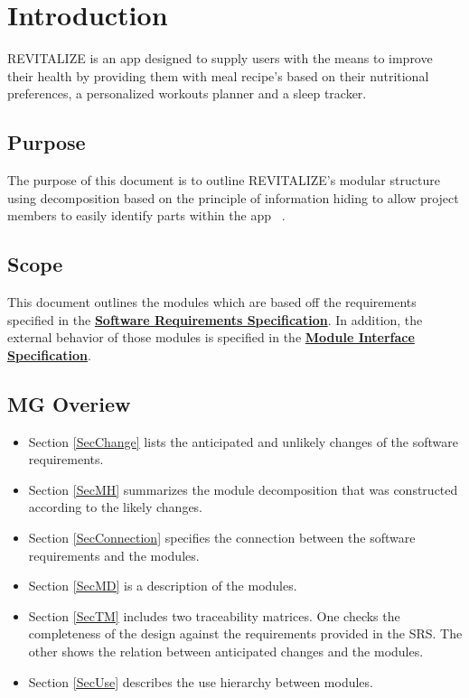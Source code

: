 \documentclass[12pt, titlepage]{article}
\begin{document}
\newpage

\tableofcontents

\listoftables

\listoffigures

\newpage


\section{Introduction}
REVITALIZE is an app designed to supply users with the means to improve their health by providing them with meal recipe's based on their nutritional preferences, a personalized workouts planner and a sleep tracker.  

\subsection{Purpose}
The purpose of this document is to outline REVITALIZE's modular structure using decomposition based on the principle of information hiding to allow project members to easily identify parts within the app ~\citep{Parnas1972a}.

\subsection{Scope}
This document outlines the modules which are based off the requirements specified
in the \href{https://github.com/BillNguyen1999/REVITALIZE/blob/main/docs/SRS/SRS.pdf}{\textbf{Software Requirements Specification}}. In addition, the external behavior of those modules is specified in the \href{https://github.com/BillNguyen1999/REVITALIZE/blob/main/docs/Design/SoftDetailedDes/MIS.pdf}{\textbf{Module Interface Specification}}.

\subsection{MG Overiew}
\begin{itemize}
	\item Section \ref{SecChange} lists the anticipated and unlikely changes of the software requirements. 
	\item Section \ref{SecMH} summarizes the module decomposition that was constructed according to the likely changes. 
	\item Section \ref{SecConnection} specifies the connection between the software requirements and the modules. \item Section \ref{SecMD} is a description of the modules. 
	\item Section \ref{SecTM} includes two traceability matrices. One checks the completeness of the design against the requirements provided in the SRS. The other shows the relation between anticipated changes and the modules. 
	\item Section \ref{SecUse} describes the use hierarchy between modules. 
\end{itemize}
\end{document}
